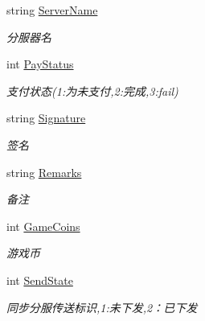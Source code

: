 \begin{DoxyCompactItemize}
string \mbox{\hyperlink{class_t_net_1_1_pay_1_1_order_info_aba21b7a30e2d6090bd4baa4f14c59a97}{Server\+Name}}
\begin{DoxyCompactList}\small\item\em 分服器名 \end{DoxyCompactList}\item 
int \mbox{\hyperlink{class_t_net_1_1_pay_1_1_order_info_a647271d8249b51a1db6722fa08b805cf}{Pay\+Status}}
\begin{DoxyCompactList}\small\item\em 支付状态(1\+:为未支付,2\+:完成,3\+:fail) \end{DoxyCompactList}\item 
string \mbox{\hyperlink{class_t_net_1_1_pay_1_1_order_info_af971df4894779a672a5ae39139fbbb4e}{Signature}}
\begin{DoxyCompactList}\small\item\em 签名 \end{DoxyCompactList}\item 
string \mbox{\hyperlink{class_t_net_1_1_pay_1_1_order_info_ad4314ee96d67ad00a085c8c14e3c7d65}{Remarks}}
\begin{DoxyCompactList}\small\item\em 备注 \end{DoxyCompactList}\item 
int \mbox{\hyperlink{class_t_net_1_1_pay_1_1_order_info_a33ec212d3ee11f7a19e66ee2964fe83a}{Game\+Coins}}
\begin{DoxyCompactList}\small\item\em 游戏币 \end{DoxyCompactList}\item 
int \mbox{\hyperlink{class_t_net_1_1_pay_1_1_order_info_ae3dc3674047e6d4542e8eff7d4802126}{Send\+State}}
\begin{DoxyCompactList}\small\item\em 同步分服传送标识,1\+:未下发,2：已下发 \end{DoxyCompactList}\item 

\end{DoxyCompactItemize}
